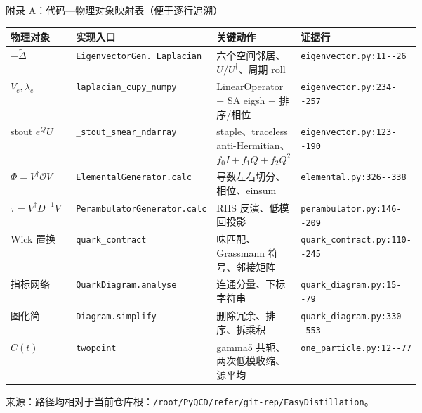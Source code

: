 \documentclass[UTF8,aspectratio=169,11pt]{ctexbeamer}
\newcommand{\source}[1]{%
  \vspace{0.06em}\par{\raggedright\scriptsize\color{muted}来源：#1\par}}
\newcommand{\codepath}[1]{\nolinkurl{#1}}
\begin{document}
\appendix

\begin{frame}[t]{附录 A：代码—物理对象映射表（便于逐行追溯）}
  \centering
  \scriptsize
  \begin{tabularx}{0.98\linewidth}{@{}L{0.23\linewidth}L{0.26\linewidth}Y L{0.19\linewidth}@{}}
    \toprule
    物理对象 & 实现入口 & 关键动作 & 证据行 \\
    \midrule
    $-\widetilde\Delta$ & \texttt{EigenvectorGen.\_Laplacian} & 六个空间邻居、$U/U^\dagger$、周期 roll & \codepath{eigenvector.py:11--26} \\
    $V_e,\lambda_e$ & \texttt{laplacian\_cupy\_numpy} & LinearOperator + SA eigsh + 排序/相位 & \codepath{eigenvector.py:234--257} \\
    stout $e^QU$ & \texttt{\_stout\_smear\_ndarray} & staple、traceless anti-Hermitian、$f_0I+f_1Q+f_2Q^2$ & \codepath{eigenvector.py:123--190} \\
    $\Phi=V^\dagger\mathcal O V$ & \texttt{ElementalGenerator.calc} & 导数左右切分、相位、einsum & \codepath{elemental.py:326--338} \\
    $\tau=V^\dagger D^{-1}V$ & \texttt{PerambulatorGenerator.calc} & RHS 反演、低模回投影 & \codepath{perambulator.py:146--209} \\
    Wick 置换 & \texttt{quark\_contract} & 味匹配、Grassmann 符号、邻接矩阵 & \codepath{quark_contract.py:110--245} \\
    指标网络 & \texttt{QuarkDiagram.analyse} & 连通分量、下标字符串 & \codepath{quark_diagram.py:15--79} \\
    图化简 & \texttt{Diagram.simplify} & 删除冗余、排序、拆乘积 & \codepath{quark_diagram.py:330--553} \\
    $C(t)$ & \texttt{twopoint} & gamma5 共轭、两次低模收缩、源平均 & \codepath{one_particle.py:12--77} \\
    \bottomrule
  \end{tabularx}
  \vspace{-0.08cm}
  \source{路径均相对于当前仓库根：\codepath{/root/PyQCD/refer/git-rep/EasyDistillation}。}
\end{frame}
\end{document}
